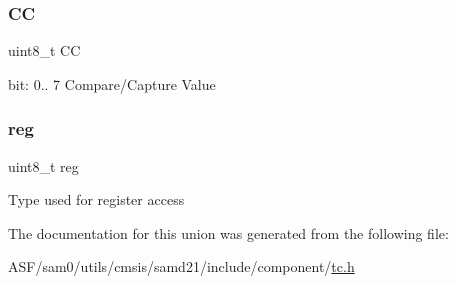 \subsubsection{\texorpdfstring{CC}{CC}}
{\footnotesize\ttfamily uint8\+\_\+t CC}

bit\+: 0.. 7 Compare/\+Capture Value \mbox{\label{union_t_c___c_o_u_n_t8___c_c___type_a9428adc9af4653a2050e2536b55dec8d}} 
\subsubsection{\texorpdfstring{reg}{reg}}
{\footnotesize\ttfamily uint8\+\_\+t reg}

Type used for register access 

The documentation for this union was generated from the following file\+:\begin{DoxyCompactItemize}
\item 
A\+S\+F/sam0/utils/cmsis/samd21/include/component/\mbox{\hyperlink{utils_2cmsis_2samd21_2include_2component_2tc_8h}{tc.\+h}}\end{DoxyCompactItemize}
